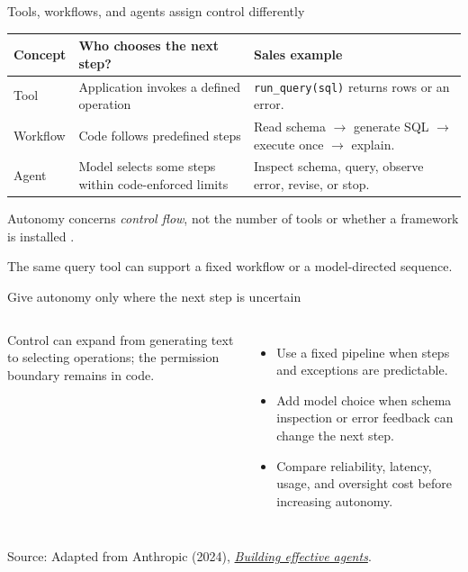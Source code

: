 \documentclass[aspectratio=169]{beamer}
\newcommand{\slidesource}[1]{\par\vfill\noindent\parbox{\linewidth}{\tiny\color{sourcegray}\raggedright\sloppy Source: #1.}}
\newcommand{\visualdescription}[1]{\par\vspace{.2em}\noindent\parbox{\linewidth}{\centering\tiny\color{sourcegray}#1}}
\begin{document}
\begin{frame}{Tools, workflows, and agents assign control differently}
\small
\begin{tabularx}{\linewidth}{@{}p{.17\linewidth}YY@{}}
\toprule
Concept & Who chooses the next step? & Sales example\\\midrule
Tool & Application invokes a defined operation & \texttt{run\_query(sql)} returns rows or an error.\\[.7em]
Workflow & Code follows predefined steps & Read schema $\to$ generate SQL $\to$ execute once $\to$ explain.\\[.7em]
Agent & Model selects some steps within code-enforced limits & Inspect schema, query, observe error, revise, or stop.\\\bottomrule
\end{tabularx}
\par\medskip
Autonomy concerns \emph{control flow}, not the number of tools or whether a framework is installed \parencite{Anthropic2024Agents}.
\visualdescription{The same query tool can support a fixed workflow or a model-directed sequence.}
\end{frame}

\begin{frame}{Give autonomy only where the next step is uncertain}
\small
\begin{columns}[c]
\centering
{}
\visualdescription{Control can expand from generating text to selecting operations; the permission boundary remains in code.}
\begin{itemize}\itemsep.5em
\item Use a fixed pipeline when steps and exceptions are predictable.
\item Add model choice when schema inspection or error feedback can change the next step.
\item Compare reliability, latency, usage, and oversight cost before increasing autonomy.
\end{itemize}
\end{columns}
\slidesource{Adapted from Anthropic (2024), \href{https://www.anthropic.com/research/building-effective-agents}{\emph{Building effective agents}}}
\end{frame}
\end{document}
